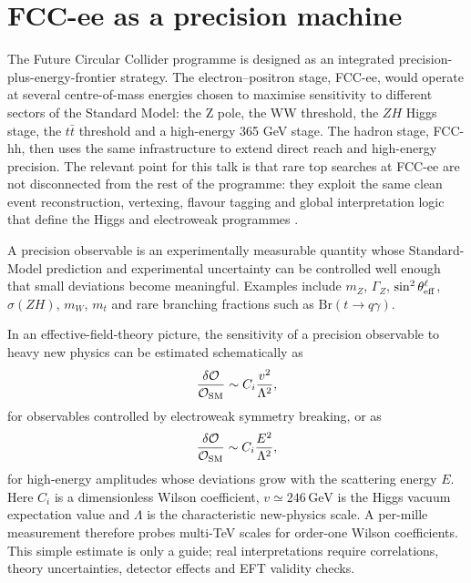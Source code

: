 \documentclass[11pt,a4paper]{report}
\newcommand{\ttbar}{t\bar t}
\newcommand{\br}{\mathrm{Br}}
\newcommand{\GeV}{\,\mathrm{GeV}}
\begin{document}
\section{FCC-ee as a precision machine}

The Future Circular Collider programme is designed as an integrated precision-plus-energy-frontier strategy.  The electron--positron stage, FCC-ee, would operate at several centre-of-mass energies chosen to maximise sensitivity to different sectors of the Standard Model: the Z pole, the WW threshold, the $ZH$ Higgs stage, the $\ttbar$ threshold and a high-energy 365 GeV stage.  The hadron stage, FCC-hh, then uses the same infrastructure to extend direct reach and high-energy precision.  The relevant point for this talk is that rare top searches at FCC-ee are not disconnected from the rest of the programme: they exploit the same clean event reconstruction, vertexing, flavour tagging and global interpretation logic that define the Higgs and electroweak programmes \cite{FCCFSR,FCCManifesto,FCCCDR}.

\begin{definitionbox}
	
A precision observable is an experimentally measurable quantity whose Standard-Model prediction and experimental uncertainty can be controlled well enough that small deviations become meaningful.  Examples include $m_Z$, $\Gamma_Z$, $\sin^2\theta_{\rm eff}^\ell$, $\sigma(ZH)$, $m_W$, $m_t$ and rare branching fractions such as $\br(t\to q\gamma)$.

\end{definitionbox}

In an effective-field-theory picture, the sensitivity of a precision observable to heavy new physics can be estimated schematically as
\begin{equation}
  \frac{\delta\mathcal O}{\mathcal O_{\rm SM}}
  \sim C_i\frac{v^2}{\Lambda^2},
  \label{eq:v2scale}
\end{equation}
for observables controlled by electroweak symmetry breaking, or as
\begin{equation}
  \frac{\delta\mathcal O}{\mathcal O_{\rm SM}}
  \sim C_i\frac{E^2}{\Lambda^2},
  \label{eq:e2scale}
\end{equation}
for high-energy amplitudes whose deviations grow with the scattering energy $E$.  Here $C_i$ is a dimensionless Wilson coefficient, $v\simeq246\GeV$ is the Higgs vacuum expectation value and $\Lambda$ is the characteristic new-physics scale.  A per-mille measurement therefore probes multi-TeV scales for order-one Wilson coefficients.  This simple estimate is only a guide; real interpretations require correlations, theory uncertainties, detector effects and EFT validity checks.
\end{document}
